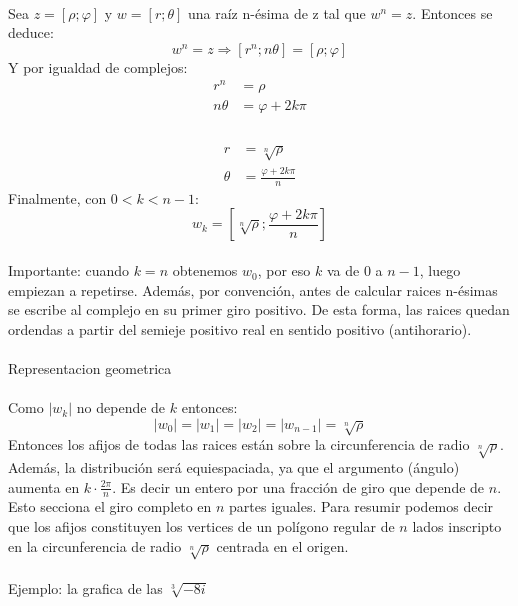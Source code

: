 \documentclass[]{article}
\begin{document}
\\
Sea $ z = [\rho;\varphi]$ y $ w = [r;\theta]$ una raíz n-ésima de z tal que $w^{n} = z$.
Entonces se deduce:
$$
w^{n} = z \Rightarrow [r^{n};n\theta] = [\rho;\varphi]
$$
Y por igualdad de complejos:
\begin{align}
  r^{n} &= \rho\\
  n\theta &= \varphi +2k\pi \\
\end{align}
\\
\begin{align}
  r &= \sqrt[n]{\rho}\\
  \theta &= \frac{\varphi+2k\pi}{n}
\end{align}
Finalmente, con $ 0 < k < n-1$: 
$$
w_k = [\sqrt[n]{\rho};\frac{\varphi+2k\pi}{n}]
$$
\\
Importante: cuando $k=n$ obtenemos $w_0$, por eso  $k$ va de $0$ a $n-1$, luego empiezan a repetirse. Además, por convención, antes de calcular raices n-ésimas se escribe al complejo en su primer giro positivo. De esta forma, las raices quedan ordendas a partir del semieje positivo real en sentido positivo (antihorario).
\\
\\
\large Representacion geometrica
\normalsize
\\
\\
Como $|w_k|$ no depende de $k$ entonces:
$$
|w_0| = |w_1| = |w_2| = |w_{n-1}| = \sqrt[n]{\rho}
$$
Entonces los afijos de todas las raices están sobre la circunferencia de radio $\sqrt[n]{\rho}$.
\\
Además, la distribución será equiespaciada, ya que el argumento (ángulo) aumenta en $k\cdot \frac{2\pi}{n}$. Es decir un entero por una fracción de giro que depende de $n$. Esto secciona el giro completo en $n$ partes iguales.
Para resumir podemos decir que los afijos constituyen los vertices de un polígono regular de $n$ lados inscripto en la circunferencia de radio $\sqrt[n]{\rho}$ centrada en el origen.
\\
\\
Ejemplo: la grafica de las $ \sqrt[3]{-8i}$
\end{document}
